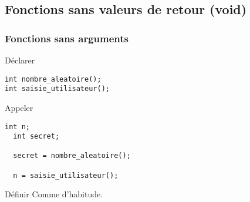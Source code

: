\documentclass[xcolor=pdftex,svgnames,table]{beamer}
\begin{document}
\subsection[Procédures]{Fonctions sans valeurs de retour (void)}
\begin{frame}[fragile]
  \frametitle{Fonctions sans arguments}

 \begin{block}{Déclarer}
    \begin{lstlisting}[basicstyle=\ttfamily\small] 
int nombre_aleatoire();
int saisie_utilisateur();
     \end{lstlisting}
  \end{block}

  \begin{block}{Appeler}
  \begin{lstlisting}[basicstyle=\ttfamily\small] 
  int n;
  int secret;

  secret = nombre_aleatoire();

  n = saisie_utilisateur();
   \end{lstlisting}  
  \end{block}

  \begin{block}{Définir}
Comme d'habitude.
\end{block}
\end{frame}


\end{document}
